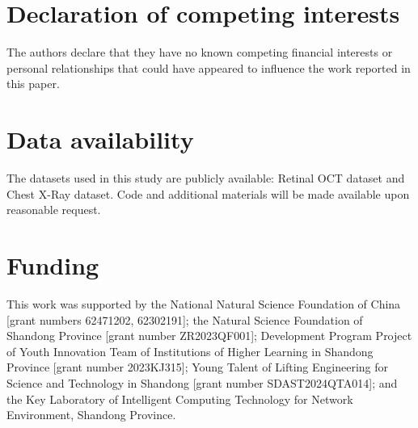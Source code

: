 \documentclass[preprint,12pt]{elsarticle}
\begin{document}
\section*{Declaration of competing interests}
The authors declare that they have no known competing financial interests or personal relationships that could have appeared to influence the work reported in this paper.

\section*{Data availability}
The datasets used in this study are publicly available: Retinal OCT dataset and Chest X-Ray dataset. Code and additional materials will be made available upon reasonable request.

\section*{Funding}
This work was supported by the National Natural Science Foundation of China [grant numbers 62471202, 62302191]; the Natural Science Foundation of Shandong Province [grant number ZR2023QF001]; Development Program Project of Youth Innovation Team of Institutions of Higher Learning in Shandong Province [grant number 2023KJ315]; Young Talent of Lifting Engineering for Science and Technology in Shandong [grant number SDAST2024QTA014]; and the Key Laboratory of Intelligent Computing Technology for Network Environment, Shandong Province.


 


\end{document}
